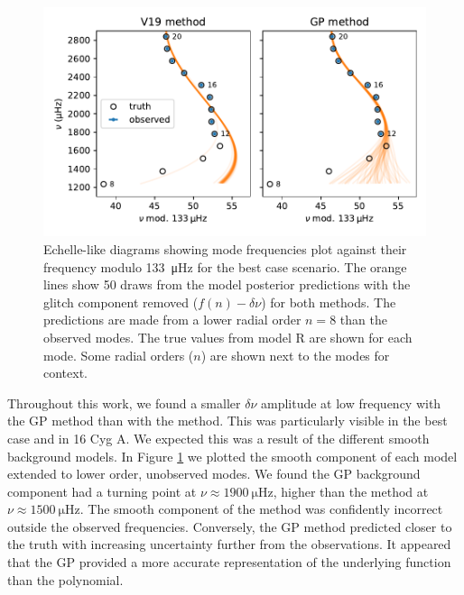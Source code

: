 \begin{figure}[tb]
    \centering
    \includegraphics{figures/glitch-test-smooth.pdf}
    \caption[Echelle-like diagrams showing mode frequencies plot against their frequency modulo \SI{133}{\micro\hertz} for the best case scenario.]{Echelle-like diagrams showing mode frequencies plot against their frequency modulo \SI{133}{\micro\hertz} for the best case scenario. The orange lines show 50 draws from the model posterior predictions with the glitch component removed (\(f(n) - \delta\nu\)) for both methods. The predictions are made from a lower radial order \(n=8\) than the observed modes. The true values from model R are shown for each mode. Some radial orders (\(n\)) are shown next to the modes for context.}
    \label{fig:best-smooth}
\end{figure}

Throughout this work, we found a smaller \(\delta\nu\) amplitude at low frequency with the GP method than with the  method. This was particularly visible in the best case and in 16 Cyg A. We expected this was a result of the different smooth background models. In Figure \ref{fig:best-smooth} we plotted the smooth component of each model extended to lower order, unobserved modes. We found the GP background component had a turning point at \(\nu \approx \SI{1900}{\micro\hertz}\), higher than the  method at \(\nu \approx \SI{1500}{\micro\hertz}\). The smooth component of the  method was confidently incorrect outside the observed frequencies. Conversely, the GP method predicted closer to the truth with increasing uncertainty further from the observations. It appeared that the GP provided a more accurate representation of the underlying function than the polynomial.

